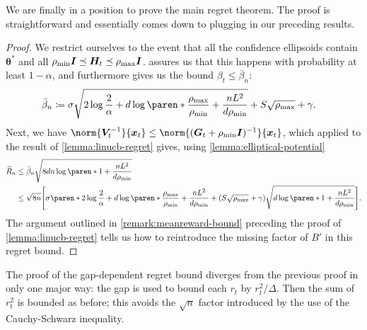 \documentclass{article}
\renewcommand{\vec}[1]{\bm{#1}}
\newcommand{\defeq}{\coloneq}
\newcommand{\inv}[1]{#1^{-1}}
\DeclarePairedDelimiter{\paren}()
\DeclarePairedDelimiter{\brck}{[}{]}
\newcommand{\Eye}[1][]{\bm{I}\notblank{#1}{_{{#1}\times{#1}}}{}}
\begin{document}
We are finally in a position to prove the main regret theorem.  The
proof is straightforward and essentially comes down to plugging in our
preceding results.

\ThmLinUCBRegret*

\begin{proof}
  We restrict ourselves to the event that all the confidence
  ellipsoids contain $\vec\theta^*$ and all
  $\rho_{\min}\Eye \preceq \vec H_t \preceq \rho_{\max}\Eye$.
   assures us that this happens with probability at least
  $1-\alpha$, and furthermore gives us the bound $\beta_t \le \bar\beta_n$:
  \begin{align*}
    \bar\beta_n &\defeq \sigma\sqrt{2\log\frac{2}{\alpha} + d\log\paren*{\frac{\rho_{\max}}{\rho_{\min}}
                 + \frac{nL^2}{d\rho_{\min}}}}
                 + S\sqrt{\rho_{\max}} + \gamma.
  \end{align*}
  Next, we have
  $\norm{\inv{\vec V_t}}{\vec x_t} \le
  \norm{\inv{(\vec G_t+\rho_{\min}\Eye)}}{\vec x_t}$, which applied to the
  result of \cref{lemma:linucb-regret} gives, using
  \cref{lemma:elliptical-potential}
  \begin{align*}
    \widehat{R}_n
    &\le \bar\beta_n\sqrt{8dn\log\paren*{1+\frac{nL^2}{d\rho_{\min}}}} \\
    &\le \sqrt{8n}\brck*{\sigma\paren*{2\log\frac{2}{\alpha}
      + d\log\paren*{\frac{\rho_{\max}}{\rho_{\min}} + \frac{nL^2}{d\rho_{\min}}}}
      + (S\sqrt{\rho_{\max}}+\gamma)\sqrt{d\log\paren*{1+\frac{nL^2}{d\rho_{\min}}}}}.
  \end{align*}
  The argument outlined in \cref{remark:meanreward-bound} preceding
  the proof of \cref{lemma:linucb-regret} tells us how to reintroduce
  the missing factor of $B'$ in this regret bound.
\end{proof}

The proof of the gap-dependent regret bound diverges from the previous
proof in only one major way: the gap is used to bound each $r_t$ by
$r_t^2/\Delta$.  Then the sum of $r_t^2$ is bounded as before; this
avoids the $\sqrt n$ factor introduced by the use of the
Cauchy-Schwarz inequality.

\ThmLinUCBGapRegret*
\end{document}
